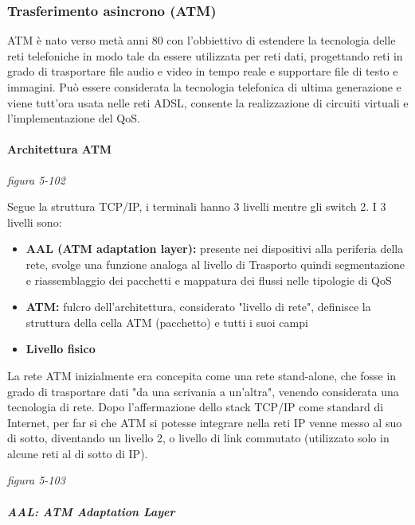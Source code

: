 \documentclass[
]{article}
\begin{document}
\hypertarget{header-n364}{%
\subsubsection{Trasferimento asincrono (ATM)}\label{header-n364}}

ATM è nato verso metà anni 80 con l'obbiettivo di estendere la
tecnologia delle reti telefoniche in modo tale da essere utilizzata per
reti dati, progettando reti in grado di trasportare file audio e video
in tempo reale e supportare file di testo e immagini. Può essere
considerata la tecnologia telefonica di ultima generazione e viene
tutt'ora usata nelle reti ADSL, consente la realizzazione di circuiti
virtuali e l'implementazione del QoS.

\hypertarget{header-n366}{%
\paragraph{Architettura ATM}\label{header-n366}}

\emph{figura 5-102}

Segue la struttura TCP/IP, i terminali hanno 3 livelli mentre gli switch
2. I 3 livelli sono:

\begin{itemize}
\item
  \textbf{AAL (ATM adaptation layer): }presente nei dispositivi alla
  periferia della rete, svolge una funzione analoga al livello di
  Trasporto quindi segmentazione e riassemblaggio dei pacchetti e
  mappatura dei flussi nelle tipologie di QoS
\item
  \textbf{ATM:} fulcro dell'architettura, considerato "livello di rete",
  definisce la struttura della cella ATM (pacchetto) e tutti i suoi
  campi
\item
  \textbf{Livello fisico}
\end{itemize}

La rete ATM inizialmente era concepita come una rete stand-alone, che
fosse in grado di trasportare dati "da una scrivania a un'altra",
venendo considerata una tecnologia di rete. Dopo l'affermazione dello
stack TCP/IP come standard di Internet, per far si che ATM si potesse
integrare nella reti IP venne messo al suo di sotto, diventando un
livello 2, o livello di link commutato (utilizzato solo in alcune reti
al di sotto di IP).

\emph{figura 5-103}

\hypertarget{header-n378}{%
\subparagraph{AAL: ATM Adaptation Layer}\label{header-n378}}
\end{document}
